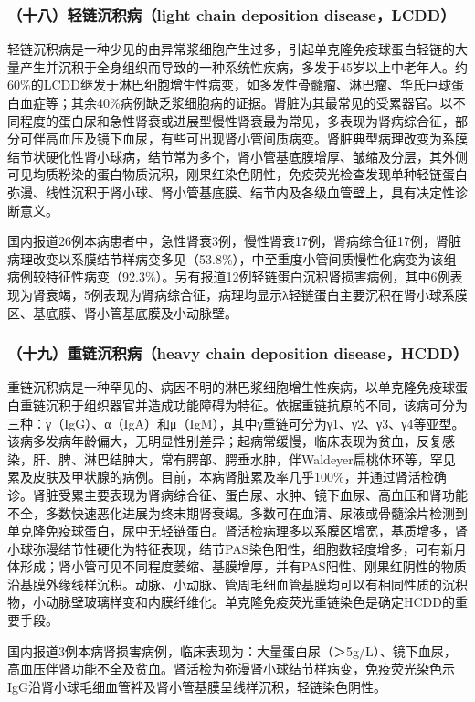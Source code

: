 \subsubsection{（十八）轻链沉积病（light chain deposition disease，LCDD）}

轻链沉积病是一种少见的由异常浆细胞产生过多，引起单克隆免疫球蛋白轻链的大量产生并沉积于全身组织而导致的一种系统性疾病，多发于45岁以上中老年人。约60\%的LCDD继发于淋巴细胞增生性病变，如多发性骨髓瘤、淋巴瘤、华氏巨球蛋白血症等；其余40\%病例缺乏浆细胞病的证据。肾脏为其最常见的受累器官。以不同程度的蛋白尿和急性肾衰或进展型慢性肾衰最为常见，多表现为肾病综合征，部分可伴高血压及镜下血尿，有些可出现肾小管间质病变。肾脏典型病理改变为系膜结节状硬化性肾小球病，结节常为多个，肾小管基底膜增厚、皱缩及分层，其外侧可见均质粉染的蛋白物质沉积，刚果红染色阴性，免疫荧光检查发现单种轻链蛋白弥漫、线性沉积于肾小球、肾小管基底膜、结节内及各级血管壁上，具有决定性诊断意义。

国内报道26例本病患者中，急性肾衰3例，慢性肾衰17例，肾病综合征17例，肾脏病理改变以系膜结节样病变多见（53.8\%），中至重度小管间质慢性化病变为该组病例较特征性病变（92.3\%）。另有报道12例轻链蛋白沉积肾损害病例，其中6例表现为肾衰竭，5例表现为肾病综合征，病理均显示λ轻链蛋白主要沉积在肾小球系膜区、基底膜、肾小管基底膜及小动脉壁。

\subsubsection{（十九）重链沉积病（heavy chain deposition disease，HCDD）}

重链沉积病是一种罕见的、病因不明的淋巴浆细胞增生性疾病，以单克隆免疫球蛋白重链沉积于组织器官并造成功能障碍为特征。依据重链抗原的不同，该病可分为三种：γ（IgG）、α（IgA）和μ（IgM），其中γ重链可分为γ1、γ2、γ3、γ4等亚型。该病多发病年龄偏大，无明显性别差异；起病常缓慢，临床表现为贫血，反复感染，肝、脾、淋巴结肿大，常有腭部、腭垂水肿，伴Waldeyer扁桃体环等，罕见累及皮肤及甲状腺的病例。目前，本病肾脏累及率几乎100\%，并通过肾活检确诊。肾脏受累主要表现为肾病综合征、蛋白尿、水肿、镜下血尿、高血压和肾功能不全，多数快速恶化进展为终末期肾衰竭。多数可在血清、尿液或骨髓涂片检测到单克隆免疫球蛋白，尿中无轻链蛋白。肾活检病理多以系膜区增宽，基质增多，肾小球弥漫结节性硬化为特征表现，结节PAS染色阳性，细胞数轻度增多，可有新月体形成；肾小管可见不同程度萎缩、基膜增厚，并有PAS阳性、刚果红阴性的物质沿基膜外缘线样沉积。动脉、小动脉、管周毛细血管基膜均可以有相同性质的沉积物，小动脉壁玻璃样变和内膜纤维化。单克隆免疫荧光重链染色是确定HCDD的重要手段。

国内报道3例本病肾损害病例，临床表现为：大量蛋白尿（＞5g/L）、镜下血尿，高血压伴肾功能不全及贫血。肾活检为弥漫肾小球结节样病变，免疫荧光染色示IgG沿肾小球毛细血管袢及肾小管基膜呈线样沉积，轻链染色阴性。


